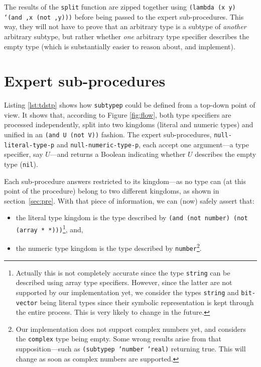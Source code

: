 \documentclass[format=sigconf]{acmart}
\newcommand\code[2][\small]{\sloppy\texttt{#1#2}}
\newcommand\footcode[1]{\code[\scriptsize]{#1}}
\theoremstyle{definition}
\begin{document}
The results of the \code{split} function are zipped together using
\code{(lambda (x y) `(and ,x (not ,y)))} before being passed to the expert
sub-procedures. This way, they will not have to prove that an arbitrary type is a
subtype of \emph{another} arbitrary subtype, but rather whether \emph{one}
arbitrary type specifier describes the empty type (which is substantially
easier to reason about, and implement).

\section{Expert sub-procedures}
\label{sec:exp}
Listing \ref{lst:tdstp} shows how \code{subtypep} could be defined from a top-down
point of view. It shows that, according to Figure \ref{fig:flow}, both type
specifiers are processed independently, split into two kingdoms (literal and
numeric types) and unified in an \code{(and U (not V))} fashion. The
expert sub-procedures, \code{null-literal-type-p} and \code{null-numeric-type-p},
each accept one argument---a type specifier, say $U$---and returns a Boolean
indicating whether $U$ describes the empty type (\code{nil}).

Each sub-procedure answers restricted to its kingdom---as no type can (at this
point of the procedure) belong to two different kingdoms, as shown in
section~\ref{sec:pre}. With that piece of information, we can (now) safely assert
that:
\begin{itemize}
\item the literal type kingdom is the type described by \code{(and (not number)
    (not (array * *)))}\footnote{%
    Actually this is not completely accurate since the type \footcode{string}
    can be described using array type specifiers. However, since the latter are
    not supported by our implementation yet, we consider the types
    \footcode{string} and \footcode{bit-vector} being literal types since their
    symbolic representation is kept through the entire process. This is very
    likely to change in the future.
  }, and,
\item the numeric type kingdom is the type described by \code{number}\footnote{%
    Our implementation does not support complex numbers yet, and considers the
    \footcode{complex} type being empty. Some wrong results arise from that
    supposition---such as \footcode{(subtypep 'number 'real)} returning true.
    This will change as soon as complex numbers are supported.
  }.
\end{itemize}
\end{document}
